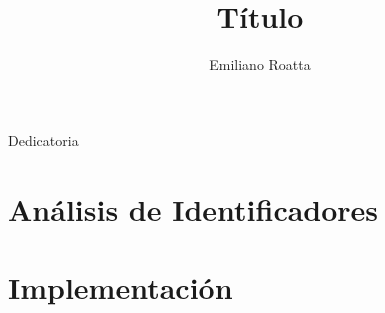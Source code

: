 \documentclass[a4paper,11pt,twoside,openright]{book}
\title{Título}
\author{Emiliano Roatta}
\begin{document}
\frontmatter

\maketitle

\begin{flushright}
\null{}
  Dedicatoria
\null
\end{flushright}



\tableofcontents
\listoffigures
\listoftables
\listofalgorithms

\mainmatter
\chapter{Análisis de Identificadores}




\chapter{Implementación}





\backmatter
\end{document}
